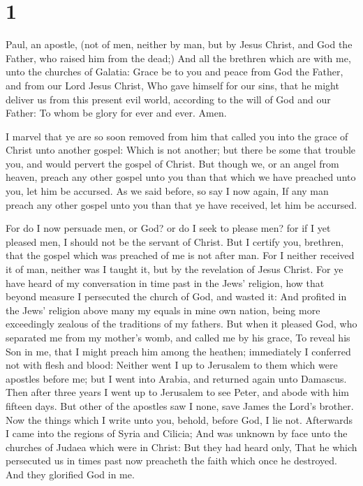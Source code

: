 \hypertarget{section}{%
\section{1}\label{section}}

 Paul, an apostle, (not of men, neither by man, but by Jesus
Christ, and God the Father, who raised him from the dead;) 
And all the brethren which are with me, unto the churches of Galatia:
 Grace be to you and peace from God the Father, and from our
Lord Jesus Christ,  Who gave himself for our sins, that he
might deliver us from this present evil world, according to the will of
God and our Father:  To whom be glory for ever and ever.
Amen.

 I marvel that ye are so soon removed from him that called
you into the grace of Christ unto another gospel:  Which is
not another; but there be some that trouble you, and would pervert the
gospel of Christ.  But though we, or an angel from heaven,
preach any other gospel unto you than that which we have preached unto
you, let him be accursed.  As we said before, so say I now
again, If any man preach any other gospel unto you than that ye have
received, let him be accursed.

 For do I now persuade men, or God? or do I seek to please
men? for if I yet pleased men, I should not be the servant of Christ.
 But I certify you, brethren, that the gospel which was
preached of me is not after man.  For I neither received it
of man, neither was I taught it, but by the revelation of Jesus Christ.
 For ye have heard of my conversation in time past in the
Jews' religion, how that beyond measure I persecuted the church of God,
and wasted it:  And profited in the Jews' religion above
many my equals in mine own nation, being more exceedingly zealous of the
traditions of my fathers.  But when it pleased God, who
separated me from my mother's womb, and called me by his grace,
 To reveal his Son in me, that I might preach him among the
heathen; immediately I conferred not with flesh and blood: 
Neither went I up to Jerusalem to them which were apostles before me;
but I went into Arabia, and returned again unto Damascus. 
Then after three years I went up to Jerusalem to see Peter, and abode
with him fifteen days.  But other of the apostles saw I
none, save James the Lord's brother.  Now the things which
I write unto you, behold, before God, I lie not. 
Afterwards I came into the regions of Syria and Cilicia; 
And was unknown by face unto the churches of Judaea which were in
Christ:  But they had heard only, That he which persecuted
us in times past now preacheth the faith which once he destroyed.
 And they glorified God in me.

